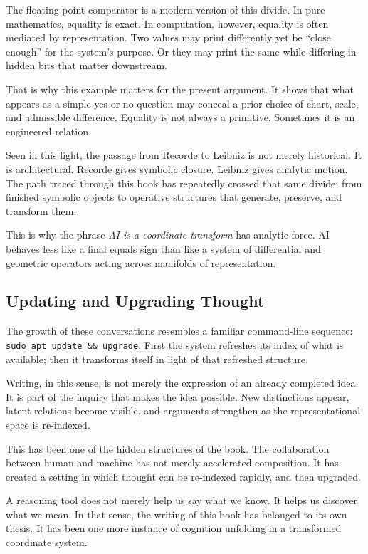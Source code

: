 The floating-point comparator is a modern version of this divide. In
pure mathematics, equality is exact. In computation, however, equality
is often mediated by representation. Two values may print differently
yet be ``close enough'' for the system's purpose. Or they may print the
same while differing in hidden bits that matter downstream.

That is why this example matters for the present argument. It shows that
what appears as a simple yes-or-no question may conceal a prior choice
of chart, scale, and admissible difference. Equality is not always a
primitive. Sometimes it is an engineered relation.

Seen in this light, the passage from Recorde to Leibniz is not merely
historical. It is architectural. Recorde gives symbolic closure. Leibniz
gives analytic motion. The path traced through this book has repeatedly
crossed that same divide: from finished symbolic objects to operative
structures that generate, preserve, and transform them.

This is why the phrase \emph{AI is a coordinate transform} has analytic
force. AI behaves less like a final equals sign than like a system of
differential and geometric operators acting across manifolds of
representation.

\hypertarget{updating-and-upgrading-thought}{%
\subsection{Updating and Upgrading
Thought}\label{updating-and-upgrading-thought}}

The growth of these conversations resembles a familiar command-line
sequence: \texttt{sudo\ apt\ update\ \&\&\ upgrade}. First the system
refreshes its index of what is available; then it transforms itself in
light of that refreshed structure.

Writing, in this sense, is not merely the expression of an already
completed idea. It is part of the inquiry that makes the idea possible.
New distinctions appear, latent relations become visible, and arguments
strengthen as the representational space is re-indexed.

This has been one of the hidden structures of the book. The
collaboration between human and machine has not merely accelerated
composition. It has created a setting in which thought can be re-indexed
rapidly, and then upgraded.

A reasoning tool does not merely help us say what we know. It helps us
discover what we mean. In that sense, the writing of this book has
belonged to its own thesis. It has been one more instance of cognition
unfolding in a transformed coordinate system.

